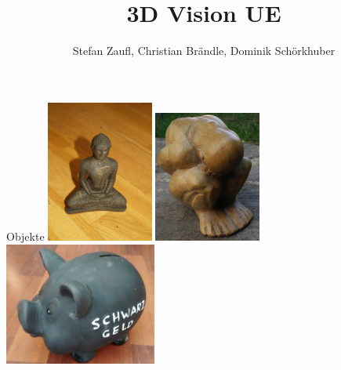 \documentclass[11pt]{beamer}
\author{Stefan Zaufl, Christian Brändle, Dominik Schörkhuber}
\title{3D Vision UE}
\begin{document}
\begin{frame}
\titlepage
\end{frame}


\begin{frame}{Objekte}
	\includegraphics[width=3.5cm]{images/Budha/Budha_Original.jpg}
	\includegraphics[width=3.5cm]{images/Mann_Original.jpg}
	\includegraphics[width=5cm]{images/sparschwein/photo.jpg}
\end{frame}
\end{document}
